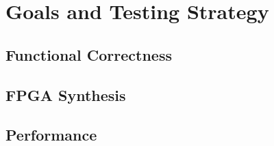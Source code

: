 \documentclass[12pt]{article}
\begin{document}
\section{Goals and Testing Strategy}

\subsection{Functional Correctness}
\subsection{FPGA Synthesis}
\subsection{Performance}

 
\end{document}
